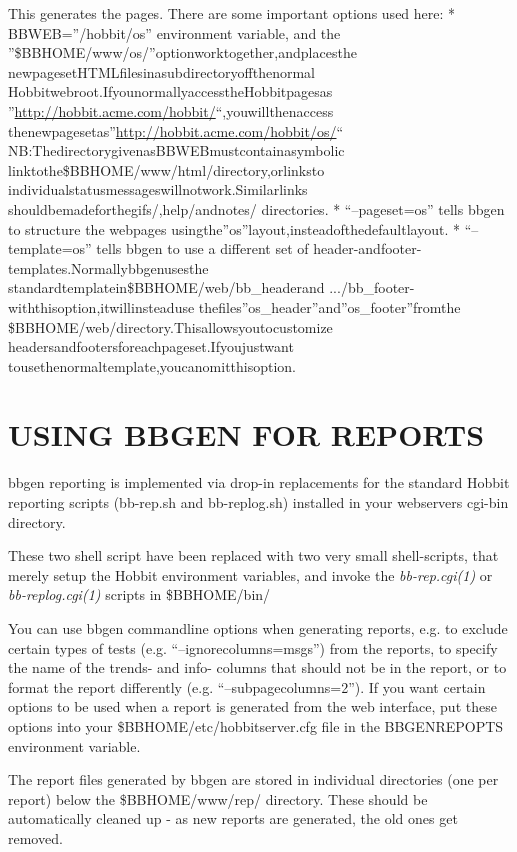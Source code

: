   This generates the pages. There are some important options used here:  
 * BBWEB=''/hobbit/os'' environment variable, and the  
''\$BBHOME/www/os/''optionworktogether,andplacesthe  
newpagesetHTMLfilesinasubdirectoryoffthenormal  
Hobbitwebroot.IfyounormallyaccesstheHobbitpagesas  
''\url{http://hobbit.acme.com/hobbit/}``,youwillthenaccess  
thenewpagesetas''\url{http://hobbit.acme.com/hobbit/os/}``  
NB:ThedirectorygivenasBBWEBmustcontainasymbolic  
linktothe\$BBHOME/www/html/directory,orlinksto  
individualstatusmessageswillnotwork.Similarlinks  
shouldbemadeforthegifs/,help/andnotes/  
directories.  
 * ``--pageset=os'' tells bbgen to structure the webpages  
usingthe''os''layout,insteadofthedefaultlayout.  
 * ``--template=os'' tells bbgen to use a different set of  
header-andfooter-templates.Normallybbgenusesthe  
standardtemplatein\$BBHOME/web/bb\_headerand  
.../bb\_footer-withthisoption,itwillinsteaduse  
thefiles''os\_header''and''os\_footer''fromthe  
\$BBHOME/web/directory.Thisallowsyoutocustomize  
headersandfootersforeachpageset.Ifyoujustwant  
tousethenormaltemplate,youcanomitthisoption. 


 
\section{USING BBGEN FOR REPORTS}
 bbgen reporting is implemented via drop-in replacements for the standard Hobbit reporting scripts (bb-rep.sh and bb-replog.sh) installed in your webservers cgi-bin directory. 

  These two shell script have been replaced with two very small
  shell-scripts, that merely setup the Hobbit environment variables,
  and invoke the \emph{bb-rep.cgi(1)} or \emph{bb-replog.cgi(1)}
  scripts in \$BBHOME/bin/ 



  You can use bbgen commandline options when generating reports,
  e.g. to exclude certain types of tests
  (e.g. ``--ignorecolumns=msgs'') from the reports, to specify the
  name of the trends- and info- columns that should not be in the
  report, or to format the report differently
  (e.g. ``--subpagecolumns=2''). If you want certain options to be
  used when a report is generated from the web interface, put these
  options into your \$BBHOME/etc/hobbitserver.cfg file in the
  BBGENREPOPTS environment variable. 



  The report files generated by bbgen are stored in individual
  directories (one per report) below the \$BBHOME/www/rep/
  directory. These should be automatically cleaned up - as new reports
  are generated, the old ones get removed. 



